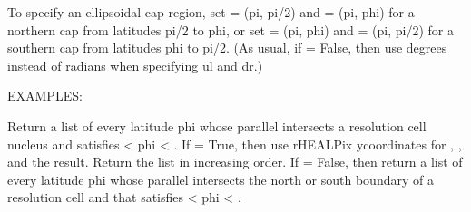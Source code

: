 \documentclass[a4paper,12ptopenany,oneside,english]{sphinxmanual}
\begin{document}
\begin{fulllineitems}
\begin{fulllineitems}
\sphinxAtStartPar
To specify an ellipsoidal cap region, set  = (\sphinxhyphen{}pi, pi/2) and
 = (\sphinxhyphen{}pi, phi) for a northern cap from latitudes pi/2 to phi, or
set  = (\sphinxhyphen{}pi, phi) and  = (\sphinxhyphen{}pi, \sphinxhyphen{}pi/2) for a southern cap from
latitudes phi to \sphinxhyphen{}pi/2.
(As usual, if  = False,
then use degrees instead of radians when specifying ul and dr.)

\sphinxAtStartPar
EXAMPLES:

\begin{sphinxVerbatim}[commandchars=\\\{\}]
  
   
     
   
\end{sphinxVerbatim}

\end{fulllineitems}


\begin{fulllineitems}
\label{\detokenize{dggs:rhealpixdggs.dggs.RHEALPixDGGS.cell_latitudes}}
\pysigstartsignatures
\pysiglinewithargsret
{}
{\sphinxparamcomma {}\sphinxparamcomma {}\sphinxparamcomma {}\sphinxparamcomma {}}
{}
\pysigstopsignatures
\sphinxAtStartPar
Return a list of every latitude phi whose parallel intersects
a resolution  cell nucleus and satisfies
 \textless{} phi \textless{} .
If  = True, then use rHEALPix y\sphinxhyphen{}coordinates for ,
, and the result. Return the list in increasing order.
If  = False, then return a list of every latitude phi whose
parallel intersects the north or south boundary of a resolution
 cell and that satisfies  \textless{} phi \textless{} .


\end{fulllineitems}
\end{fulllineitems}
\end{document}
